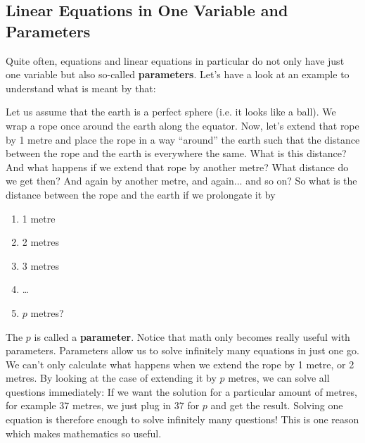 \newpage

\subsection{Linear Equations in One Variable and Parameters}

Quite often, equations and linear equations in particular do not only have just one variable but also so-called \textbf{parameters}. Let's have a look at an example to understand what is meant by that:

\begin{example}
Let us assume that the earth is a perfect sphere (i.e. it looks like a ball). We wrap a rope once around the earth along the equator. Now, let's extend that rope by 1 metre and place the rope in a way ``around'' the earth such that the distance between the rope and the earth is everywhere the same. What is this distance? And what happens if we extend that rope by another metre? What distance do we get then? And again by another metre, and again... and so on? So what is the distance between the rope and the earth if we prolongate it by
\begin{enumerate}[label=\emph{\alph*})]

\item 1 metre
\item 2 metres
\item 3 metres
\item \ldots
\item $p$ metres?
\end{enumerate}
\end{example}

The $p$ is called a \textbf{parameter}. Notice that math only becomes really useful with parameters. Parameters allow us to solve infinitely many equations in just one go. We can't only calculate what happens when we extend the rope by 1 metre, or 2 metres. By looking at the case of extending it by $p$ metres, we can solve all questions immediately: If we want the solution for a particular amount of metres, for example 37 metres, we just plug in 37 for $p$ and get the result. Solving one equation is therefore enough to solve infinitely many questions! This is one reason which makes mathematics so useful. 
\vsp

